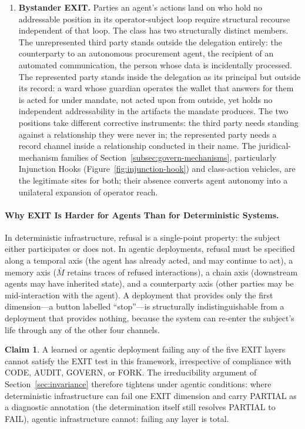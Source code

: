 \documentclass{article}
\theoremstyle{definition}
\newtheorem{claim}{Claim}[section]
\begin{document}
\begin{enumerate}[noitemsep]
    \item \textbf{Bystander EXIT.} Parties an agent's actions land on who hold no addressable position in its operator-subject loop require structural recourse independent of that loop. The class has two structurally distinct members. The unrepresented third party stands outside the delegation entirely: the counterparty to an autonomous procurement agent, the recipient of an automated communication, the person whose data is incidentally processed. The represented party stands inside the delegation as its principal but outside its record: a ward whose guardian operates the wallet that answers for them is acted for under mandate, not acted upon from outside, yet holds no independent addressability in the artifacts the mandate produces. The two positions take different corrective instruments: the third party needs standing against a relationship they were never in; the represented party needs a record channel inside a relationship conducted in their name. The juridical-mechanism families of Section~\ref{subsec:govern-mechanisms}, particularly Injunction Hooks (Figure~\ref{fig:injunction-hook}) and class-action vehicles, are the legitimate sites for both; their absence converts agent autonomy into a unilateral expansion of operator reach.
\end{enumerate}

\paragraph{Why EXIT Is Harder for Agents Than for Deterministic Systems.} In deterministic infrastructure, refusal is a single-point property: the subject either participates or does not. In agentic deployments, refusal must be specified along a temporal axis (the agent has already acted, and may continue to act), a memory axis ($\bar{M}$ retains traces of refused interactions), a chain axis (downstream agents may have inherited state), and a counterparty axis (other parties may be mid-interaction with the agent). A deployment that provides only the first dimension---a button labelled ``stop''---is structurally indistinguishable from a deployment that provides nothing, because the system can re-enter the subject's life through any of the other four channels.

\begin{claim}
A learned or agentic deployment failing any of the five EXIT layers cannot satisfy the EXIT test in this framework, irrespective of compliance with CODE, AUDIT, GOVERN, or FORK. The irreducibility argument of Section~\ref{sec:invariance} therefore tightens under agentic conditions: where deterministic infrastructure can fail one EXIT dimension and carry PARTIAL as a diagnostic annotation (the determination itself still resolves PARTIAL to FAIL), agentic infrastructure cannot: failing any layer is total.
\end{claim}
\end{document}
